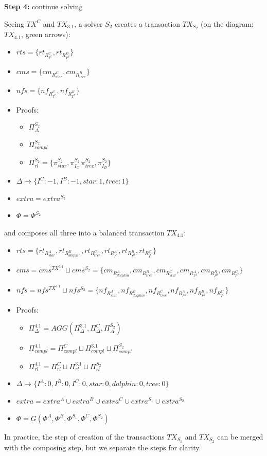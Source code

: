 \documentclass[
    11pt,            %
    techreport,        %
    affiltop,       %
]{art}
\begin{document}
\textbf{Step 4:} continue solving

Seeing $TX^C$ and $TX_{3.1}$, a solver $S_2$ creates a transaction $TX_{S_2}$ (on the diagram: $TX_{4.1}$, green arrows):

\begin{itemize}
    \item $rts = \{rt_{R^C_{I^{C}}}, rt_{R^B_{I^{B}}}\}$
    \item $cms = \{
    cm_{R^C_{star}}, cm_{R^B_{tree}}\}$
    \item $nfs = \{nf_{R^C_{I^{C}}}, nf_{R^B_{I^{B}}}\}$
    \item Proofs:
    \begin{itemize}
        \item $\Pi^{S_2}_{\Delta}$
        \item $\Pi^{S_2}_{compl}$
        \item $\Pi^{S_2}_{rl} = \{\pi^{S_2}_{star}, \pi^{S_2}_{I_C}\, \pi^{S_2}_{tree}, \pi^{S_2}_{I_B}\}$
    \end{itemize}
    \item $\Delta \mapsto \{I^{C}: -1, I^{B}: -1, star: 1, tree: 1\}$
    \item $extra = extra^{S_2}$
    \item $\Phi = \Phi^{S_2}$
\end{itemize}

and composes all three into a balanced transaction $TX_{4.1}$:

\begin{itemize}
    \item $rts = \{rt_{R^A_{star}}, rt_{R^B_{dolphin}}, rt_{R^C_{tree}}, rt_{R^A_{I^{A}}}, rt_{R^B_{I^{B}}}, rt_{R^C_{I^{C}}}\}$
    \item $cms = cms^{TX^{3.1}} \sqcup cms^{S_2} =\{cm_{R^A_{dolphin}}, cm_{R^B_{tree}}, cm_{R^C_{star}}, cm_{R^A_{I^{A}}}, cm_{R^B_{I^{B}}}, cm_{R^C_{I^{C}}}\}$
    \item $nfs = nfs^{TX^{3.1}} \sqcup nfs^{S_2} = \{nf_{R^A_{star}}, nf_{R^B_{dolphin}}, nf_{R^C_{tree}}, nf_{R^A_{I^{A}}}, nf_{R^B_{I^{B}}}, nf_{R^C_{I^{C}}}\}$
    \item Proofs:
    \begin{itemize}
        \item $\Pi^{4.1}_{\Delta} = AGG(\Pi^{3.1}_{\Delta}, \Pi^{C}_{\Delta}, \Pi^{S_2}_{\Delta})$
        \item $\Pi^{4.1}_{compl} = \Pi^C_{compl} \sqcup \Pi^{3.1}_{compl} \sqcup \Pi^{S_2}_{compl}$
        \item $\Pi^{4.1}_{rl} = \Pi^C_{rl} \sqcup \Pi^{3.1}_{rl} \sqcup \Pi^{S_2}_{rl}$
    \end{itemize}
    \item $\Delta \mapsto \{I^{A}: 0, I^{B}: 0, I^{C}: 0, star: 0, dolphin: 0, tree: 0\}$
    \item $extra = extra^A \cup extra^B \cup extra^C \cup extra^{S_1} \cup extra^{S_2}$
    \item $\Phi = G(\Phi^A, \Phi^B, \Phi^{S_1}, \Phi^C, \Phi^{S_2})$
\end{itemize}

In practice, the step of creation of the transactions $TX_{S_1}$ and $TX_{S_2}$ can be merged with the composing step, but we separate the steps for clarity.
\end{document}
